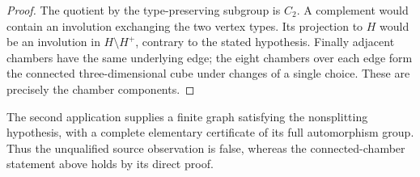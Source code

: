 \begin{proof}
The quotient by the type-preserving subgroup is $C_2$. A complement
would contain an involution exchanging the two vertex types. Its
projection to $H$ would be an involution in $H\setminus H^+$,
contrary to the stated hypothesis. Finally adjacent chambers have the
same underlying edge; the eight chambers over each edge form the
connected three-dimensional cube under changes of a single choice.
These are precisely the chamber components.
\end{proof}

The second application supplies a finite graph satisfying the nonsplitting
hypothesis, with a complete elementary certificate of its full automorphism
group. Thus the unqualified source observation is false, whereas the
connected-chamber statement above holds by its direct proof.
